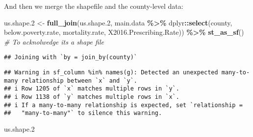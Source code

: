 \documentclass[
]{article}
\newenvironment{Shaded}{\begin{snugshade}}{\end{snugshade}}
\newcommand{\CommentTok}[1]{\textcolor[rgb]{0.56,0.35,0.01}{\textit{#1}}}
\newcommand{\FloatTok}[1]{\textcolor[rgb]{0.00,0.00,0.81}{#1}}
\newcommand{\FunctionTok}[1]{\textcolor[rgb]{0.13,0.29,0.53}{\textbf{#1}}}
\newcommand{\NormalTok}[1]{#1}
\newcommand{\OtherTok}[1]{\textcolor[rgb]{0.56,0.35,0.01}{#1}}
\newcommand{\SpecialCharTok}[1]{\textcolor[rgb]{0.81,0.36,0.00}{\textbf{#1}}}
\begin{document}
\vspace{6mm}

And then we merge the shapefile and the county-level data:

\vspace{6mm}

\begin{Shaded}
\begin{Highlighting}[]
\NormalTok{us.shape}\FloatTok{.2} \OtherTok{\textless{}{-}} \FunctionTok{full\_join}\NormalTok{(us.shape}\FloatTok{.2}\NormalTok{,}
\NormalTok{  main.data }\SpecialCharTok{\%\textgreater{}\%}
\NormalTok{    dplyr}\SpecialCharTok{::}\FunctionTok{select}\NormalTok{(county, below.poverty.rate, mortality.rate, X2016.Prescribing.Rate)) }\SpecialCharTok{\%\textgreater{}\%}
  \FunctionTok{st\_as\_sf}\NormalTok{() }\CommentTok{\# To acknolwedge its a shape file}
\end{Highlighting}
\end{Shaded}

\begin{verbatim}
## Joining with `by = join_by(county)`
\end{verbatim}

\begin{verbatim}
## Warning in sf_column %in% names(g): Detected an unexpected many-to-many relationship between `x` and `y`.
## i Row 1205 of `x` matches multiple rows in `y`.
## i Row 1138 of `y` matches multiple rows in `x`.
## i If a many-to-many relationship is expected, set `relationship =
##   "many-to-many"` to silence this warning.
\end{verbatim}

\begin{Shaded}
\begin{Highlighting}[]
\NormalTok{us.shape}\FloatTok{.2}
\end{Highlighting}
\end{Shaded}
\end{document}
